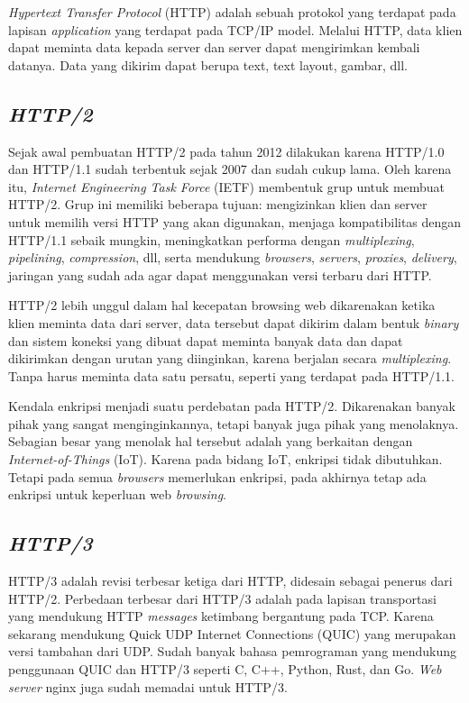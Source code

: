 \emph{Hypertext Transfer Protocol} (HTTP) adalah sebuah protokol yang terdapat pada lapisan \emph{application} yang terdapat pada TCP/IP model. Melalui HTTP, data klien dapat meminta data kepada server dan server dapat mengirimkan kembali datanya. Data yang dikirim dapat berupa text, text layout, gambar, dll.

\subsection{\emph{HTTP/2}}

Sejak awal pembuatan HTTP/2 pada tahun 2012 dilakukan karena HTTP/1.0 dan HTTP/1.1 sudah terbentuk sejak 2007 dan sudah cukup lama. Oleh karena itu, \emph{Internet Engineering Task Force} (IETF) membentuk grup untuk membuat HTTP/2. Grup ini memiliki beberapa tujuan: mengizinkan klien dan server untuk memilih versi HTTP yang akan digunakan, menjaga kompatibilitas dengan HTTP/1.1 sebaik mungkin, meningkatkan performa dengan \emph{multiplexing}, \emph{pipelining}, \emph{compression}, dll, serta mendukung \emph{browsers}, \emph{servers}, \emph{proxies}, \emph{delivery}, jaringan yang sudah ada agar dapat menggunakan versi terbaru dari HTTP.

HTTP/2 lebih unggul dalam hal kecepatan browsing web dikarenakan ketika klien meminta data dari server, data tersebut dapat dikirim dalam bentuk \emph{binary} dan sistem koneksi yang dibuat dapat meminta banyak data dan dapat dikirimkan dengan urutan yang diinginkan, karena berjalan secara \emph{multiplexing}. Tanpa harus meminta data satu persatu, seperti yang terdapat pada HTTP/1.1.

Kendala enkripsi menjadi suatu perdebatan pada HTTP/2. Dikarenakan banyak pihak yang sangat menginginkannya, tetapi banyak juga pihak yang menolaknya. Sebagian besar yang menolak hal tersebut adalah yang berkaitan dengan \emph{Internet-of-Things} (IoT). Karena pada bidang IoT, enkripsi tidak dibutuhkan. Tetapi pada semua \emph{browsers} memerlukan enkripsi, pada akhirnya tetap ada enkripsi untuk keperluan web \emph{browsing}.

\subsection{\emph{HTTP/3}}

HTTP/3 adalah revisi terbesar ketiga dari HTTP, didesain sebagai penerus dari HTTP/2. Perbedaan terbesar dari HTTP/3 adalah pada lapisan transportasi yang mendukung HTTP \emph{messages} ketimbang bergantung pada TCP. Karena sekarang mendukung Quick UDP Internet Connections (QUIC) yang merupakan versi tambahan dari UDP. Sudah banyak bahasa pemrograman yang mendukung penggunaan QUIC dan HTTP/3 seperti C, C++, Python, Rust, dan Go. \emph{Web server} nginx juga sudah memadai untuk HTTP/3.

